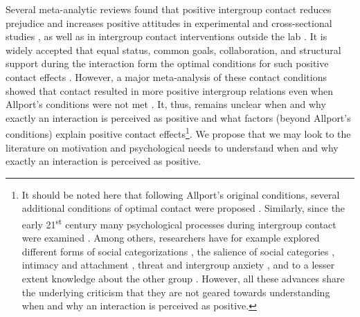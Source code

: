 \documentclass[man, 12pt, a4paper]{apa7}
\theoremstyle{break}
\theoremstyle{plain}
\begin{document}
Several meta-analytic reviews found that positive intergroup contact reduces prejudice and increases positive attitudes in experimental and cross-sectional studies \citep[][]{Tropp2005, Pettigrew2006, Davies2011}, as well as in intergroup contact interventions outside the lab \citep[][]{Beelmann2014, Lemmer2015}. It is widely accepted that equal status, common goals, collaboration, and structural support during the interaction form the optimal conditions for such positive contact effects \citep[Allport's Optimal Contact conditions;][]{Allport1954b, Pettigrew1969}. However, a major meta-analysis of these contact conditions showed that contact resulted in more positive intergroup relations even when Allport's conditions were not met \citep[][]{Pettigrew2006}. It, thus, remains unclear when and why exactly an interaction is perceived as positive and what factors (beyond Allport's conditions) explain positive contact effects\footnote{It should be noted here that following Allport's original conditions, several additional conditions of optimal contact were proposed \citep[for a critical discussion see][]{Pettigrew1986}. Similarly, since the early 21\textsuperscript{st} century many psychological processes during intergroup contact were examined \citep[e.g. see,][]{Paolini2021}. Among others, researchers have for example explored different forms of social categorizations \citep[][]{Pettigrew1998}, the salience of social categories \citep[][]{Brown2005}, intimacy \citep[e.g.,][]{Marinucci2021} and attachment \citep[e.g.,][]{Tropp2021}, threat and intergroup anxiety \citep[e.g.,][]{Stephan2008, Paolini2004}, and to a lesser extent knowledge about the other group \citep[][]{Pettigrew2008c}. However, all these advances share the underlying criticism that they are not geared towards understanding when and why an interaction is perceived as positive.}. We propose that we may look to the literature on motivation and psychological needs to understand when and why exactly an interaction is perceived as positive.

\end{document}
